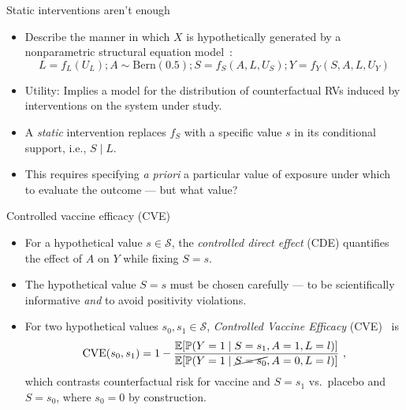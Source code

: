 \documentclass{beamer}
\begin{document}

\begin{frame}[c]{Static interventions aren't enough}

\begin{center}
\begin{itemize}
  \itemsep8pt
  \item Describe the manner in which $X$ is hypothetically generated by a
    nonparametric structural equation model~\citep{pearl2009causality}:
    \begin{equation*}
      L = f_L(U_L); A \sim \text{Bern}(0.5);
      S = f_S(A, L, U_S); Y = f_Y(S, A, L, U_Y)
    \end{equation*}
  \item Utility: Implies a model for the distribution of counterfactual RVs
    induced by interventions on the system under study.
  \item A \textit{static} intervention replaces $f_S$ with a specific value $s$
    in its conditional support, i.e., $S \mid L$.
  \item This requires specifying \textit{a priori} a particular value of
    exposure under which to evaluate the outcome --- but what value?
\end{itemize}
\end{center}

\note{
}

\end{frame}


\begin{frame}[c]{Controlled vaccine efficacy (CVE)}

\begin{center}
\begin{itemize}
  \itemsep8pt
  \item For a hypothetical value $s \in \mathcal{S}$, the \textit{controlled
    direct effect} (CDE) quantifies the effect of $A$ on $Y$ while fixing
    $S = s$.
  \item The hypothetical value $S = s$ must be chosen carefully --- to
    be scientifically informative \textit{and} to avoid positivity violations.
  \item For two hypothetical values $s_0, s_1 \in \mathcal{S}$,
    \textit{Controlled Vaccine Efficacy} (CVE)~\citep{gilbert2022controlled} is
  \begin{equation*}
    \text{CVE}(s_0, s_1) = 1 -
      \frac{\mathbb{E}[\mathbb{P}(Y = 1 \mid S = s_1, A = 1, L = l)]}
      {\mathbb{E}[\mathbb{P}(Y = 1 \mid \cancel{S = s_0}, A = 0, L = l)]} \ ,
  \end{equation*}
  which contrasts counterfactual risk for vaccine and $S = s_1$ vs.~placebo
  and $S = s_0$, where $s_0 = 0$ by construction.
\end{itemize}
\end{center}

\note{
}

\end{frame}
\end{document}
